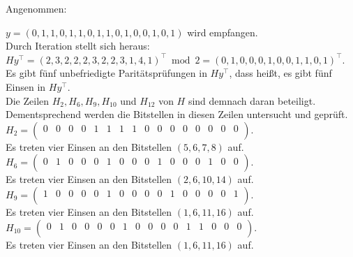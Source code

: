     \begin{Beispiel}
        Angenommen:
    
        $y = (0,1,1,0,1,1,0,1,1,0,1,0,0,1,0,1)$ wird empfangen.\\
        
        Durch Iteration stellt sich heraus:\\
        $Hy^\intercal= (2,3,2,2,2,3,2,2,3,1,4,1)^\intercal \bmod 2= (0,1,0,0,0,1,0,0,1,1,0,1)^\intercal.$\\
        
        Es gibt fünf unbefriedigte Paritätsprüfungen in $Hy^\intercal$,
        dass hei\ss{}t, es gibt fünf Einsen in $Hy^\intercal.$\\
        Die Zeilen $H_2, H_6, H_9, H_{10}$ und $H_{12}$ von $H$ sind demnach daran beteiligt.\\ 
        Dementsprechend werden die Bitstellen in diesen Zeilen untersucht und geprüft.\\
        
        $H_2= \left( \begin{array}{rrrrrrrrrrrrrrrr}
            0 & 0 & 0 & 0 & 1 & 1 & 1 & 1 & 0 & 0 & 0 & 0 & 0 & 0 & 0 & 0 \\
           \end{array}\right). 
        $\\
        Es treten vier Einsen an den Bitstellen $(5, 6, 7, 8)$ auf.\\
        
        $H_6= \left( \begin{array}{rrrrrrrrrrrrrrrr}
            0 & 1 & 0 & 0 & 0 & 1 & 0 & 0 & 0 & 1 & 0 & 0 & 0 & 1 & 0 & 0 \\
           \end{array}\right). 
        $\\
        Es treten vier Einsen an den Bitstellen $(2, 6, 10, 14)$ auf.\\
        
        $H_9= \left( \begin{array}{rrrrrrrrrrrrrrrr}
            1 & 0 & 0 & 0 & 0 & 1 & 0 & 0 & 0 & 0 & 1 & 0 & 0 & 0 & 0 & 1 \\
           \end{array}\right). 
        $\\
        Es treten vier Einsen an den Bitstellen $(1, 6, 11, 16)$ auf.\\
        
        $H_{10}= \left( \begin{array}{rrrrrrrrrrrrrrrr}
            0 & 1 & 0 & 0 & 0 & 0 & 1 & 0 & 0 & 0 & 0 & 1 & 1 & 0 & 0 & 0 \\
           \end{array}\right). 
        $\\
        Es treten vier Einsen an den Bitstellen $(1, 6, 11, 16)$ auf.\\
        

\end{Beispiel}
